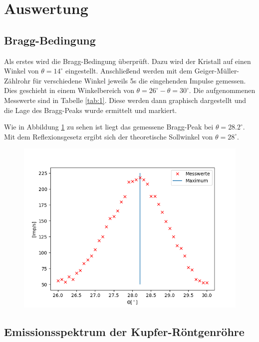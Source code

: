 \section{Auswertung}

\subsection{Bragg-Bedingung}

Als erstes wird die Bragg-Bedingung überprüft. Dazu wird der Kristall auf einen Winkel von $\theta = 14^\circ$ eingestellt. Anschließend werden mit dem Geiger-Müller-Zählrohr für verschiedene Winkel jeweils 5s die eingehenden Impulse gemessen. Dies geschieht in einem Winkelbereich von $\theta = 26^\circ-\theta = 30^\circ$. Die aufgenommenen Messwerte sind in Tabelle \ref{tab:1}. Diese werden dann graphisch dargestellt und die Lage des Bragg-Peaks wurde ermittelt und markiert. 

Wie in Abbildung \ref{fig:Bragg} zu sehen ist liegt das gemessene Bragg-Peak bei $\theta = 28.2^\circ$. Mit dem Reflexionsgesetz ergibt sich der theoretische Sollwinkel von $\theta = 28^\circ$.

\begin{figure}
    \centering
    \includegraphics{bragg.png}
    \label{fig:Bragg}
\end{figure}

\subsection{Emissionsspektrum der Kupfer-Röntgenröhre}


